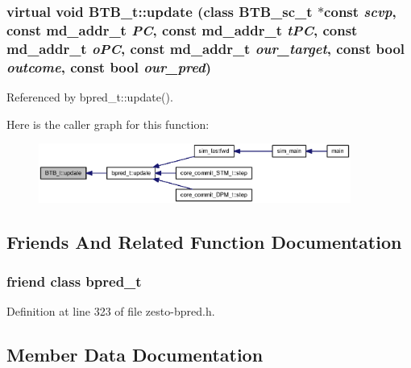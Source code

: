 \subsubsection[{update}]{\setlength{\rightskip}{0pt plus 5cm}virtual void BTB\_\-t::update (class {\bf BTB\_\-sc\_\-t} $\ast$const  {\em scvp}, \/  const {\bf md\_\-addr\_\-t} {\em PC}, \/  const {\bf md\_\-addr\_\-t} {\em tPC}, \/  const {\bf md\_\-addr\_\-t} {\em oPC}, \/  const {\bf md\_\-addr\_\-t} {\em our\_\-target}, \/  const bool {\em outcome}, \/  const bool {\em our\_\-pred})\hspace{0.3cm}{\tt  [pure virtual]}}\label{classBTB__t_2e44e8499c9d2926bf958c40b1dc0b4c}




Referenced by bpred\_\-t::update().

Here is the caller graph for this function:\nopagebreak
\begin{figure}[H]
\begin{center}
\leavevmode
\includegraphics[width=290pt]{classBTB__t_2e44e8499c9d2926bf958c40b1dc0b4c_icgraph}
\end{center}
\end{figure}


\subsection{Friends And Related Function Documentation}
\subsubsection[{bpred\_\-t}]{\setlength{\rightskip}{0pt plus 5cm}friend class {\bf bpred\_\-t}\hspace{0.3cm}{\tt  [friend]}}\label{classBTB__t_44319d3cf67079457eb46e2c6fcfeb49}




Definition at line 323 of file zesto-bpred.h.

\subsection{Member Data Documentation}
